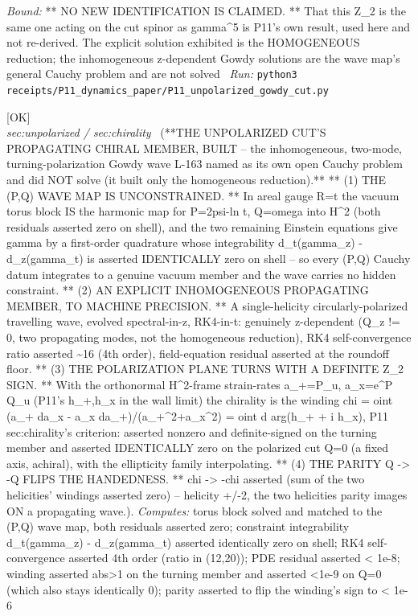 \begin{description}
 \emph{Bound:} ** NO NEW IDENTIFICATION IS CLAIMED. ** That this Z\_2 is the same one acting on the cut spinor as gamma\textasciicircum{}5 is P11's own result, used here and not re-derived. The explicit solution exhibited is the HOMOGENEOUS reduction; the inhomogeneous z-dependent Gowdy solutions are the wave map's general Cauchy problem and are not solved
\ \emph{Run:} \texttt{python3 receipts/P11\_dynamics\_paper/P11\_unpolarized\_gowdy\_cut.py}
\item[\rcptlabel{P11_propagating_chiral_member}{P11R8}\textbf{P11R8}\quad\texttt{P11\_propagating\_chiral\_member}]\hfill\textsf{[OK]}\\
\textit{sec:unpolarized / sec:chirality} \ (**THE UNPOLARIZED CUT'S PROPAGATING CHIRAL MEMBER, BUILT -- the inhomogeneous, two-mode, turning-polarization Gowdy wave L-163 named as its own open Cauchy problem and did NOT solve (it built only the homogeneous reduction).** ** (1) THE (P,Q) WAVE MAP IS UNCONSTRAINED. ** In areal gauge R=t the vacuum torus block IS the harmonic map for P=2psi-ln t, Q=omega into H\textasciicircum{}2 (both residuals asserted zero on shell), and the two remaining Einstein equations give gamma by a first-order quadrature whose integrability d\_t(gamma\_z) - d\_z(gamma\_t) is asserted IDENTICALLY zero on shell -- so every (P,Q) Cauchy datum integrates to a genuine vacuum member and the wave carries no hidden constraint. ** (2) AN EXPLICIT INHOMOGENEOUS PROPAGATING MEMBER, TO MACHINE PRECISION. ** A single-helicity circularly-polarized travelling wave, evolved spectral-in-z, RK4-in-t: genuinely z-dependent (Q\_z != 0, two propagating modes, not the homogeneous reduction), RK4 self-convergence ratio asserted \textasciitilde{}16 (4th order), field-equation residual asserted at the roundoff floor. ** (3) THE POLARIZATION PLANE TURNS WITH A DEFINITE Z\_2 SIGN. ** With the orthonormal H\textasciicircum{}2-frame strain-rates a\_+=P\_u, a\_x=e\textasciicircum{}P Q\_u (P11's h\_+,h\_x in the wall limit) the chirality is the winding chi = oint (a\_+ da\_x - a\_x da\_+)/(a\_+\textasciicircum{}2+a\_x\textasciicircum{}2) = oint d arg(h\_+ + i h\_x), P11 sec:chirality's criterion: asserted nonzero and definite-signed on the turning member and asserted IDENTICALLY zero on the polarized cut Q=0 (a fixed axis, achiral), with the ellipticity family interpolating. ** (4) THE PARITY Q -> -Q FLIPS THE HANDEDNESS. ** chi -> -chi asserted (sum of the two helicities' windings asserted zero) -- helicity +/-2, the two helicities parity images ON a propagating wave.). 
\emph{Computes:} torus block solved and matched to the (P,Q) wave map, both residuals asserted zero; constraint integrability d\_t(gamma\_z) - d\_z(gamma\_t) asserted identically zero on shell; RK4 self-convergence asserted 4th order (ratio in (12,20)); PDE residual asserted < 1e-8; winding asserted abs>1 on the turning member and asserted <1e-9 on Q=0 (which also stays identically 0); parity asserted to flip the winding's sign to < 1e-6

\end{description}
